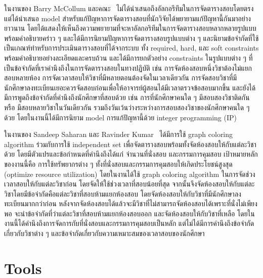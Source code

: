ในงานของ Barry McCollum และคณะ~\cite{auto-timetable} 
ไม่ได้นำเสนอถึงอัลกอรึทึมในการจัดตารางสอบโดยตรง แต่ได้นำเสนอ model สำหรับแก้ปัญหาการจัดตารางสอบที่นักวิจัยได้พยายามแก้ปัญหานี้กันมาอย่างยาวนาน
โดยได้แสดงให้เห็นถึงความพยายามที่จะหาอัลกอริทึมในการจัดตารางสอบหลากหลายรูปแบบพร้อมคำอธิบายคร่าว ๆ และได้มีการนิยามปัญหาการจัดตารางสอบรูปแบบต่าง ๆ
และนิยามข้อจำกัดที่ใช้เป็นเกณฑ์ทำหรับการประเมินตารางสอบที่ได้จากระบบ ทั้ง required, hard, และ soft constraints พร้อมคำอธิบายอย่างละเอียดและครบถ้วน 
และได้มีการยกตัวอย่าง constraints ในรูปแบบต่าง ๆ ที่เป็นข้อจำกัดที่เราคำนึงถึงในการจัดตารางสอบในทางปฏิบัติ เช่น การจัดห้องสอบหนึ่งวิชาต้องไม่แยกสอบหลายห้อง 
การจัดเวลาสอบให้วิชาที่มีหลายตอนต้องจัดในเวลาเดียวกัน การจัดสอบวิชาที่มีนักศึกษาลงทะเบียนเยอะควรจัดสอบก่อนเพื่อให้อาจารย์ผู้สอนได้มีเวลาตรวจข้อสอบมากขึ้น และยังได้มีการพูดถึงข้อจำกัดที่คำนึงถึงนักศึกษาที่สอบด้วย เช่น การที่นักศึกษาคนใด ๆ มีสอบสองวิชาติดกัน หรือ มีสอบหลายวิชาในวันเดียวกัน 
รวมถึงวันเว้นว่างระหว่างการสอบสองวิชาของนักศึกษาคนใด ๆ ด้วย โดยในงานนี้ได้มีการนิยาม model การแก้ปัญหานี้ด้วย integer programming (IP)

ในงานของ Sandeep Saharan และ Ravinder Kumar~\cite{graphcl-idepset}
ได้มีการใช้ graph coloring algorithm ร่วมกับการใช้ independent set
เพื่อจัดตารางสอบพร้อมทั้งจัดห้องสอบให้กับแต่ละวิชาด้วย โดยมีตัวแปรและข้อกำหนดที่คำนึงถึงได้แก่ จำนวนที่นั่งสอบ และกรรมการคุมสอบ
เป้าหมายหลักของงานนี้คือ การใช้ทรัพยากรต่าง ๆ ทั้งที่นั่งสอบและกรรมการคุมสอบให้เกิดประโยชน์สูงสุด (optimize resource utilization)
โดยในงานได้ใช้ graph coloring algorithm ในการจัดช่วงเวลาสอบให้กับแต่ละวิชาก่อน โดยจัดให้ใช้ช่วงเวลาที่สอบน้อยที่สุด
จากนั้นจึงจัดห้องสอบให้กับแต่ละวิชาโดยมีข้อจำกัดคือแต่ละวิชาที่สอบห้ามแยกห้องสอบ โดยจัดห้องสอบให้กับวิชาที่มีนักศึกษาลงทะเบียนมากกว่าก่อน
หลังจากจัดห้องสอบได้แล้วจะมีวิชาที่ไม่สามารถจัดห้องสอบได้เพราะที่นั่งไม่เพียงพอ 
จะนำข้อจำกัดที่ว่าแต่ละวิชาที่สอบห้ามแยกห้องสอบออก และจัดห้องสอบให้กับวิชาที่เหลือ
โดยในงานนี้ได้คำนึงถึงการจัดการกับที่นั่งสอบและกรรมการคุมสอบเป็นหลัก แต่ไม่ได้มีการคำนึงถึงข้อจำกัดเกี่ยวกับวิชาต่าง ๆ และข้อจำกัดเกี่ยวกับความเหมาะสมของเวลาสอบของนักศึกษา

\iffalse
\section{Tools}
